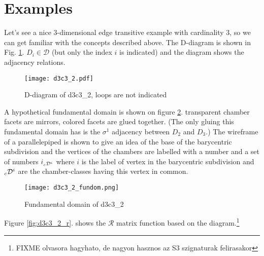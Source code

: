 \documentclass[12pt,a4paper]{article}
\newcommand{\leftsub}[2]{{\vphantom{#2}}_{#1}{#2}}
\theoremstyle{plain}%
\theoremstyle{definition}
\theoremstyle{remark}
\begin{document}
\section{Examples}

Let's see a nice $3$-dimensional edge transitive example with cardinality $3$,
so we can get familiar with the concepts described above. The D-diagram is shown
in Fig.  \ref{fig:d3c3_2}. $D_i\in \mathcal{D}$ (but only the index $i$ is
indicated) and the diagram shows the adjacency relations.

\begin{figure}
  \caption{\label{fig:d3c3_2} D-diagram of d3c3\_2, loops are not indicated}
  \center
  \texttt{[image: d3c3\_2.pdf]}
\end{figure}

A hypothetical fundamental domain is shown on figure \ref{fig:d3c3_2_fundom}.
transparent chamber facets are mirrors, colored facets are glued together. (The
only gluing this fundamental domain has is the $\sigma^1$ adjacency between
$D_2$ and $D_3$.) The wireframe of a parallelepiped is shown to give an idea of
the base of the barycentric subdivision and the vertices of the chambers are
labelled with a number and a set of numbers $i_{\leftsub{c}{\mathcal{D}}^i}$
where $i$ is the label of vertex in the barycentric subdivision and
$\leftsub{c}{\mathcal{D}}^i$ are the chamber-classes having this vertex in
common.

\begin{figure}
  \caption{\label{fig:d3c3_2_fundom} Fundamental domain of d3c3\_2}
  \center
  \texttt{[image: d3c3\_2\_fundom.png]}
\end{figure}

Figure \ref{fig:d3c3_2_r}. shows the $\mathcal{R}$ matrix function based on the
diagram.\footnote{FIXME olvasora hagyhato, de nagyon hasznos az S3 szignaturak
felirasakor}
\end{document}
